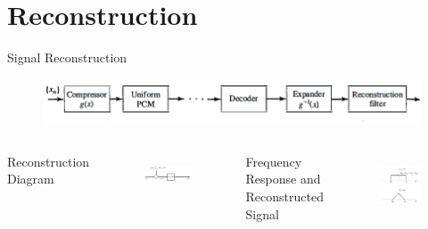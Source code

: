 \section{Reconstruction} %
\begin{frame}{Signal Reconstruction}
    \begin{figure}
        \centering
        \includegraphics[width=0.7\linewidth]{img/non-unifor_PCM.png}
        \label{fig:block_pcm}
    \end{figure}
       \begin{columns}

         Reconstruction Diagram
 \begin{figure}
        \centering
        \includegraphics[width=1\linewidth]{img/reconstruction_3.png}
        \label{fig:a-law}
    \end{figure}
Frequency Response and Reconstructed Signal
\begin{figure}
        \centering
        \includegraphics[width=.7\linewidth]{img/reconstruction_2.png}
        \label{fig:a-law}
    \end{figure}
 
    \end{columns}
\end{frame}

